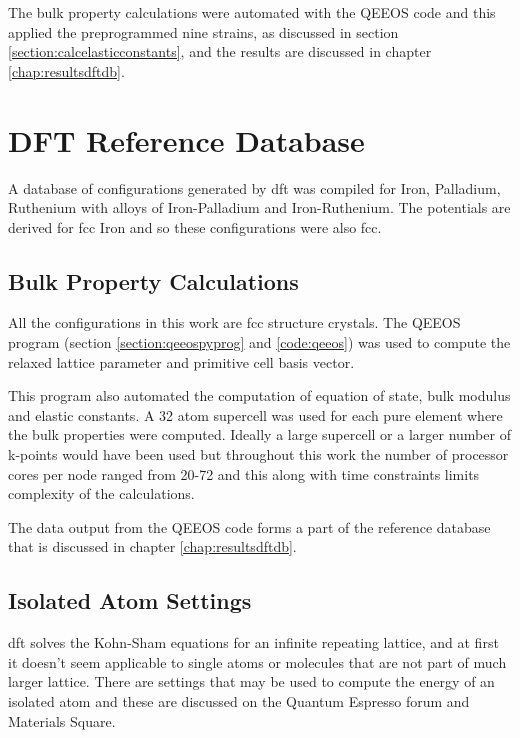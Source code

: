 The bulk property calculations were automated with the QEEOS code and this applied the preprogrammed nine strains, as discussed in section \ref{section:calcelasticconstants}, and the results are discussed in chapter \ref{chap:resultsdftdb}. 





\section{DFT Reference Database}

A database of configurations generated by \acrshort{dft} was compiled for Iron, Palladium, Ruthenium with alloys of Iron-Palladium and Iron-Ruthenium.  The potentials are derived for \acrshort{fcc} Iron and so these configurations were also \acrshort{fcc}.


\subsection{Bulk Property Calculations}

All the configurations in this work are \acrshort{fcc} structure crystals.  The QEEOS program (section \ref{section:qeeospyprog} and \ref{code:qeeos}) was used to compute the relaxed lattice parameter and primitive cell basis vector.

This program also automated the computation of equation of state, bulk modulus and elastic constants.  A 32 atom supercell was used for each pure element where the bulk properties were computed.  Ideally a large supercell or a larger number of k-points would have been used but throughout this work the number of processor cores per node ranged from 20-72 and this along with time constraints limits complexity of the calculations.

The data output from the QEEOS code forms a part of the reference database that is discussed in chapter \ref{chap:resultsdftdb}.



\subsection{Isolated Atom Settings}

\acrlong{dft} solves the Kohn-Sham equations for an infinite repeating lattice, and at first it doesn't seem applicable to single atoms or molecules that are not part of much larger lattice.  There are settings that may be used to compute the energy of an isolated atom and these are discussed on the Quantum Espresso forum\cite{qeforum} and Materials Square\cite{materialssquaresingleatom}. 

